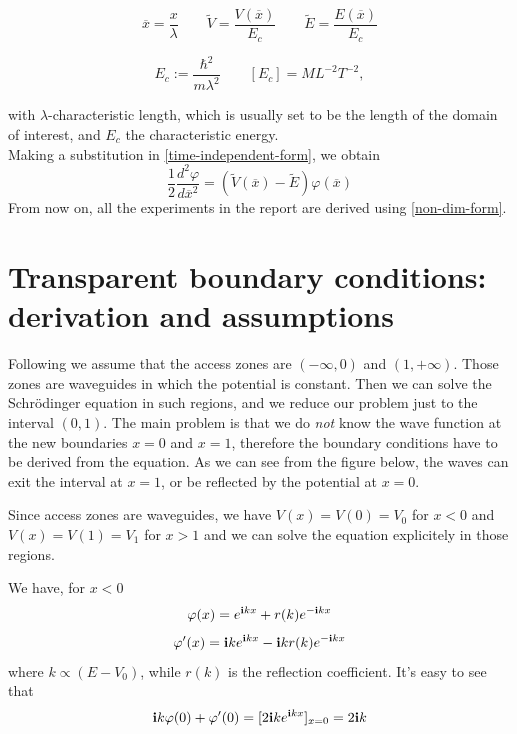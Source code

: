 \documentclass[12pt,a4paper,onecolumn]{article}
\theoremstyle{definition}
\theoremstyle{plain}
\begin{document}
\begin{equation*}
\overline{x} = \frac{x}{\lambda}\qquad \widetilde{V} = \frac{V(\overline{x})}{E_{c}}\qquad \widetilde{E} = \frac{E(\overline{x})}{E_{c}}
\end{equation*}

\begin{equation*}
    E_{c} := \frac{\hbar^2}{m \lambda^2}\qquad \left[ E_{c} \right] = ML^{-2}T^{-2},
\end{equation*}

with $\lambda$-characteristic length, which is usually set to be the length of the domain of interest, and $E_{c}$ the characteristic energy.\\
Making a substitution in \eqref{time-independent-form}, we obtain
\begin{equation}
\label{non-dim-form}
    \frac{1}{2} \frac{d^2 \varphi}{d \overline{x}^2} = ( \widetilde{V}(\overline{x})-\widetilde{E} ) \varphi(\overline{x})
\end{equation}
From now on, all the experiments in the report are derived using \eqref{non-dim-form}.


\section{Transparent boundary conditions: derivation and assumptions}

Following \cite{bc} we assume that the access zones are $(-\infty,0)$ and $(1, +\infty)$. Those zones are waveguides in which the potential is constant. Then we can solve the Schr{\"o}dinger equation in such regions, and we reduce our problem just to the interval $(0,1)$. The main problem is that we do \emph{not} know the wave function at the new boundaries $x=0$ and $x=1$, therefore the boundary conditions have to be derived from the equation. As we can see from the figure below, the waves can exit the interval  at $x=1$, or be reflected by the potential at $x=0$.

Since access zones are waveguides, we have $V(x)=V(0)=V_0$ for $x <0$ and $V(x)=V(1)=V_1$ for $x>1$ and we can solve the equation explicitely in those regions. 



We have, for $x <0$
\[ 
\varphi(x)=e^{\bold{i}kx}+r(k)e^{-\bold{i}kx} 
\]
\[
\varphi'(x)=\bold{i} k e^{\bold{i}kx} - \bold{i}k r(k)e^{-\bold{i}kx}
\]
where $k  \propto (E-V_0)$, while $r(k)$ is the reflection coefficient. It's easy to see that 
\[ 
\bold{i} k \varphi(0)+\varphi'(0)=[2 \bold{i}k e^{\bold{i}k x} ]_{x=0}=2 \bold{i} k
\]
\end{document}
